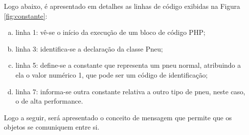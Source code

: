 \FloatBarrier 	%

Logo abaixo, é apresentado em detalhes as linhas de código exibidas na Figura 
\ref{fig:constante}:

\begin{enumerate}[a)]
    \item linha 1: vê-se o início da execução de um bloco de código PHP;
    \item linha 3: identifica-se a declaração da classe Pneu;
    \item linha 5: define-se a constante que representa um pneu normal,
    atribuindo a ela o valor numérico 1, que pode ser um código de
    identificação;
    \item linha 7: informa-se outra constante relativa a outro tipo de pneu,
    neste caso, o de alta performance.
\end{enumerate}

Logo a seguir, será apresentado o conceito de mensagem que permite que os
objetos se comuniquem entre si.
